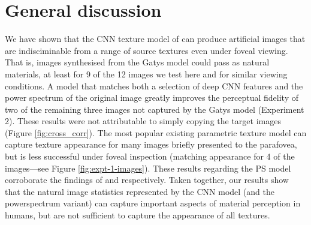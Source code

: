 \documentclass[doc, 11pt,a4paper,natbib]{apa6}\usepackage[]{graphicx}\usepackage[]{color}
\begin{document}
\section{General discussion}

We have shown that the CNN texture model of \citet{gatys_texture_2015-1} can produce artificial images that are indisciminable from a range of source textures even under foveal viewing.
That is, images synthesised from the Gatys model could pass as natural materials, at least for 9 of the 12 images we test here and for similar viewing conditions.
A model that matches both a selection of deep CNN features and the power spectrum of the original image \citep{liu_texture_2016} greatly improves the perceptual fidelity of two of the remaining three images not captured by the Gatys model (Experiment 2).
These results were not attributable to simply copying the target images (Figure \ref{fig:cross_corr}).
The most popular existing parametric texture model \citep[PS;][]{portilla_parametric_2000} can capture texture appearance for many images briefly presented to the parafovea, but is less successful under foveal inspection (matching appearance for 4 of the images---see Figure \ref{fig:expt-1-images}).
These results regarding the PS model corroborate the findings of \citet{balas_texture_2006} and \citet{balas_contrast_2012} respectively.
Taken together, our results show that the natural image statistics represented by the CNN model (and the powerspectrum variant) can capture important aspects of material perception in humans, but are not sufficient to capture the appearance of all textures.
\end{document}
